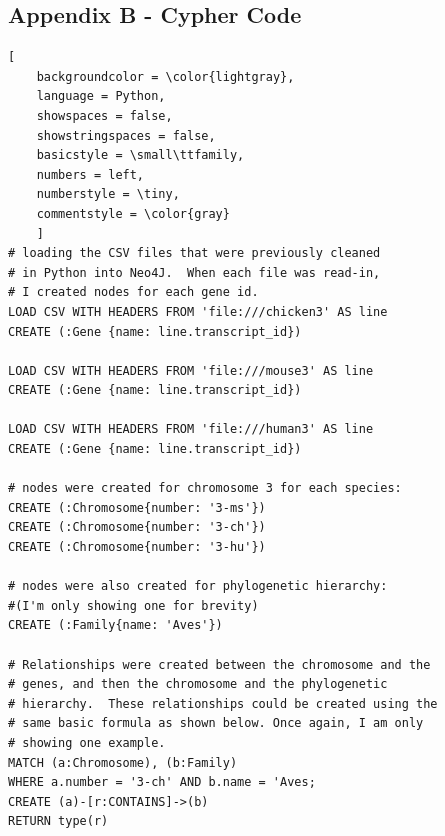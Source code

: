 \documentclass[]{article}
\begin{document}
\subsection{Appendix B - Cypher Code}

\begin{lstlisting}[
	backgroundcolor = \color{lightgray},
	language = Python,
	showspaces = false,
	showstringspaces = false,
	basicstyle = \small\ttfamily,
	numbers = left,
	numberstyle = \tiny,
	commentstyle = \color{gray}
	]
# loading the CSV files that were previously cleaned 
# in Python into Neo4J.  When each file was read-in,
# I created nodes for each gene id.
LOAD CSV WITH HEADERS FROM 'file:///chicken3' AS line
CREATE (:Gene {name: line.transcript_id})

LOAD CSV WITH HEADERS FROM 'file:///mouse3' AS line
CREATE (:Gene {name: line.transcript_id})

LOAD CSV WITH HEADERS FROM 'file:///human3' AS line
CREATE (:Gene {name: line.transcript_id})

# nodes were created for chromosome 3 for each species:
CREATE (:Chromosome{number: '3-ms'})
CREATE (:Chromosome{number: '3-ch'})
CREATE (:Chromosome{number: '3-hu'})

# nodes were also created for phylogenetic hierarchy:
#(I'm only showing one for brevity)
CREATE (:Family{name: 'Aves'})

# Relationships were created between the chromosome and the
# genes, and then the chromosome and the phylogenetic
# hierarchy.  These relationships could be created using the
# same basic formula as shown below. Once again, I am only
# showing one example.
MATCH (a:Chromosome), (b:Family)
WHERE a.number = '3-ch' AND b.name = 'Aves;
CREATE (a)-[r:CONTAINS]->(b)
RETURN type(r)
\end{lstlisting}
\end{document}
